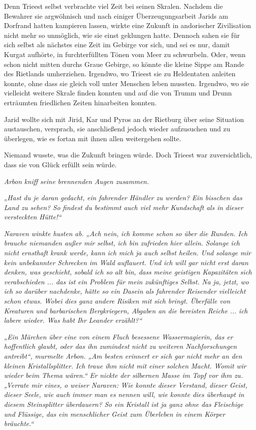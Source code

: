Denn Trieest selbst verbrachte viel Zeit bei seinen Skralen. Nachdem die Bewahrer sie argwöhnisch und nach einiger Überzeugungsarbeit Jarids am Dorfrand hatten kampieren lassen, wirkte eine Zukunft in andorischer Zivilisation nicht mehr so unmöglich, wie sie einst geklungen hatte. Dennoch sahen sie für sich selbst als nächstes eine Zeit im Gebirge vor sich, und sei es nur, damit Kurgat aufhörte, in furchterfüllten Tönen vom Meer zu schwurbeln. Oder, wenn schon nicht mitten durchs Graue Gebirge, so könnte die kleine Sippe am Rande des Rietlands umherziehen. Irgendwo, wo Trieest sie zu Heldentaten anleiten konnte, ohne dass sie gleich voll unter Menschen leben mussten. Irgendwo, wo sie vielleicht weitere Skrale finden konnten und auf die von Trumm und Drunn erträumten friedlichen Zeiten hinarbeiten konnten.

Jarid wollte sich mit Jirid, Kar und Pyros an der Rietburg über seine Situation austauschen, versprach, sie anschließend jedoch wieder aufzusuchen und zu überlegen, wie es fortan mit ihnen allen weitergehen sollte.

Niemand wusste, was die Zukunft bringen würde. Doch Trieest war zuversichtlich, dass sie von Glück erfüllt sein würde.\bigskip







\textit{Arbon kniff seine brennenden Augen zusammen.}

\textit{„Hast du je daran gedacht, ein fahrender Händler zu werden? Ein bisschen das Land zu sehen? So findest du bestimmt auch viel mehr Kundschaft als in dieser versteckten Hütte!“}

\textit{Naraven winkte husten ab. „Ach nein, ich komme schon so über die Runden. Ich brauche niemanden außer mir selbst, ich bin zufrieden hier allein. Solange ich nicht ernsthaft krank werde, kann ich mich ja auch selbst heilen. Und solange mir kein unbekannter Schrecken im Wald auflauert. Und ich will gar nicht erst daran denken, was geschieht, sobald ich so alt bin, dass meine geistigen Kapazitäten sich verabschieden ... das ist ein Problem für mein zukünftiges Selbst. Na ja, jetzt, wo ich so darüber nachdenke, hätte so ein Dasein als fahrender Reisender vielleicht schon etwas. Wobei dies ganz andere Risiken mit sich bringt. Überfälle von Kreaturen und barbarischen Bergkriegern, Abgaben an die bereisten Reiche ... ich labere wieder. Was habt Ihr Leander erzählt?“}

\textit{„Ein Märchen über eine von einem Fluch besessene Wassermagierin, das er hoffentlich glaubt, oder das ihn zumindest nicht zu weiteren Nachforschungen antreibt“, murmelte Arbon. „Am besten erinnert er sich gar nicht mehr an den kleinen Kristallsplitter. Ich traue ihm nicht mit einer solchen Macht. Womit wir wieder beim Thema wären.“ Er nickte der silbernen Masse im Topf vor ihm zu. „Verrate mir eines, o weiser Naraven: Wie konnte dieser Verstand, dieser Geist, dieser Seele, wie auch immer man es nennen will, wie konnte dies überhaupt in diesem Steinsplitter überdauern? So ein Kristall ist ja ganz ohne das Fleischige und Flüssige, das ein menschlicher Geist zum Überleben in einem Körper bräuchte.“}

